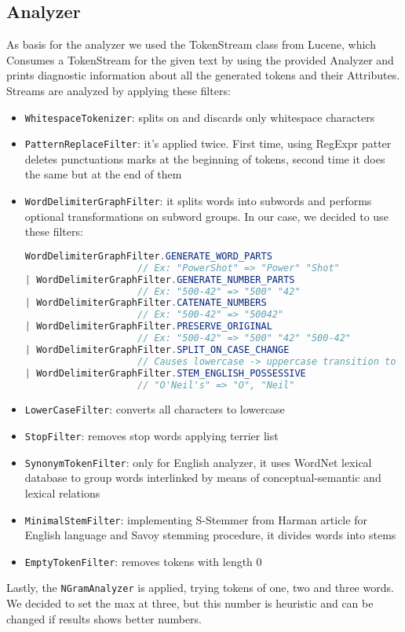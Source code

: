 \subsection{Analyzer}
As basis for the analyzer we used the TokenStream class from Lucene, which 
Consumes a TokenStream for the given text by using the provided
Analyzer and prints diagnostic information about all the generated tokens and
their Attributes.\\
Streams are analyzed by applying these filters:
\begin{itemize}
    \item \texttt{WhitespaceTokenizer}: splits on and discards only
    whitespace characters %
    \item \texttt{PatternReplaceFilter}: it's applied twice. First time, using RegExpr patter deletes punctuations
    marks at the beginning of tokens, second time it does the same but at the end of them
    \item \texttt{WordDelimiterGraphFilter}: it splits words into subwords and performs optional transformations on subword groups.
        In our case, we decided to use these filters:
    \begin{lstlisting}[language=Java]
WordDelimiterGraphFilter.GENERATE_WORD_PARTS
                    // Ex: "PowerShot" => "Power" "Shot"
| WordDelimiterGraphFilter.GENERATE_NUMBER_PARTS
                    // Ex: "500-42" => "500" "42"
| WordDelimiterGraphFilter.CATENATE_NUMBERS
                    // Ex: "500-42" => "50042"
| WordDelimiterGraphFilter.PRESERVE_ORIGINAL
                    // Ex: "500-42" => "500" "42" "500-42"
| WordDelimiterGraphFilter.SPLIT_ON_CASE_CHANGE
                    // Causes lowercase -> uppercase transition to start a new subword.
| WordDelimiterGraphFilter.STEM_ENGLISH_POSSESSIVE
                    // "O'Neil's" => "O", "Neil"
    \end{lstlisting}
    \item \texttt{LowerCaseFilter}: converts all characters to lowercase %
    \item \texttt{StopFilter}: removes stop words applying terrier list\cite{stopword}
    \item \texttt{SynonymTokenFilter}: only for English analyzer, it uses WordNet lexical database\cite{wordnet} to group words
        interlinked by means of conceptual-semantic and lexical relations
    \item \texttt{MinimalStemFilter}: implementing S-Stemmer from Harman article\cite{engStemFilter} for English language
        and Savoy stemming procedure\cite{frStemFilter}, it divides words into stems
    \item \texttt{EmptyTokenFilter}: removes tokens with length 0
\end{itemize}
    Lastly, the \texttt{NGramAnalyzer} is applied, trying tokens of one, two and three words. We decided to set the max at three,
    but this number is heuristic and can be changed if results shows better numbers.\\

